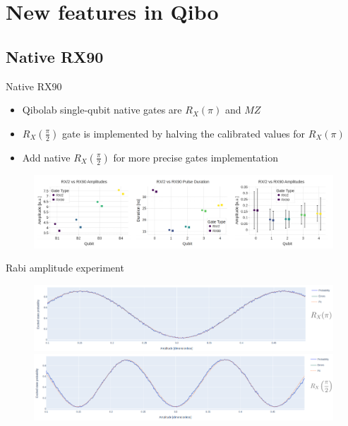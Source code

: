 \documentclass[aspectratio=169,10pt]{beamer}
\begin{document}
\section{New features in Qibo}
\subsection{Native RX90}

\begin{frame}{Native RX90}
  \begin{itemize}
    \item Qibolab single-qubit native gates are $R_X(\pi)$ and $MZ$
    \item $R_X(\frac{\pi}{2})$ gate is implemented by halving the calibrated values for $R_X(\pi)$ 
    \item Add native $R_X(\frac{\pi}{2})$ for more precise gates implementation
  \end{itemize}
  \begin{figure}
    \centering
    \includegraphics[width=\textwidth]{figures/RX90.png}
  \end{figure}
\end{frame}

\begin{frame}{Rabi amplitude experiment}
    \begin{figure}
    \centering
    \includegraphics[width=\textwidth]{figures/B4.png}
    \vfill
    \includegraphics[width=\textwidth]{figures/B4_90.png}
  \end{figure}
\end{frame}
\end{document}
